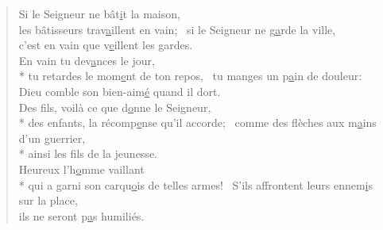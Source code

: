 
\begin{verse}
Si le Seigneur ne bât\underline{i}t la maison, \\
les bâtisseurs trav\underline{a}illent en vain;~\psalmstar
si le Seigneur ne g\underline{a}rde la ville, \\
c’est en vain que v\underline{e}illent les gardes. \\

En vain tu dev\underline{a}nces le jour, \\*
tu retardes le mom\underline{e}nt de ton repos,~\psalmdagger
tu manges un p\underline{a}in de douleur:~\psalmstar
Dieu comble son bien-aim\underline{é} quand il dort. \\

Des fils, voilà ce que d\underline{o}nne le Seigneur, \\*
des enfants, la récomp\underline{e}nse qu’il accorde;~\psalmstar
{}comme des flèches aux m\underline{a}ins d’un guerrier, \\*
ainsi les f\underline{i}ls de la jeunesse. \\

Heureux l’h\underline{o}mme vaillant \\*
qui a garni son carqu\underline{o}is de telles armes!~\psalmstar
S’ils affrontent leurs ennem\underline{i}s sur la place, \\
ils ne seront p\underline{a}s humiliés. \\
\end{verse}

